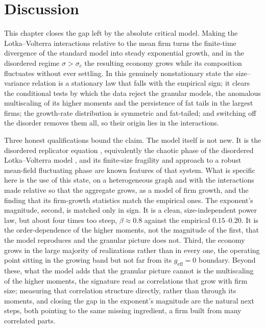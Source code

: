 \section{Discussion}
\label{sec:growing-discussion}

This chapter closes the gap left by the absolute critical model. Making the
Lotka--Volterra interactions relative to the mean firm turns the finite-time divergence
of the standard model into steady exponential growth, and in the disordered regime
$\sigma > \sigma_c$ the resulting economy grows while its composition fluctuates without
ever settling. In this genuinely nonstationary state the size--variance relation is a
stationary law that falls with the empirical sign; it clears the conditional tests by
which the data reject the granular models, the anomalous multiscaling of its higher
moments and the persistence of fat tails in the largest firms; the growth-rate
distribution is symmetric and fat-tailed; and switching off the disorder removes them all, so
their origin lies in the interactions.

Three honest qualifications bound the claim. The model itself is not new. It is the
disordered replicator equation \citep{diederich1989,hofbauer81}, equivalently the
chaotic phase of the disordered Lotka--Volterra model \citep{bunin2017,galla2018,roy2020},
and its finite-size fragility and approach to a robust mean-field fluctuating phase are
known features of that system. What is specific here is the use of this state, on a
heterogeneous graph and with the interactions made relative so that the aggregate grows,
as a model of firm growth, and the finding that its firm-growth statistics match the
empirical ones. The exponent's magnitude, second, is matched only in sign. It is a clean,
size-independent power law, but about four times too steep, $\beta \approx 0.8$ against the
empirical $0.15$--$0.20$. It is the order-dependence of the higher moments, not
the magnitude of the first, that the model reproduces and the granular picture does not.
Third, the economy grows in the large
majority of realizations rather than in every one, the operating point sitting in the
growing band but not far from its $g_{\mathrm{eff}} = 0$ boundary. Beyond these, what the model adds that the granular picture cannot is the multiscaling of
the higher moments, the signature \citet{moran2024} read as correlations that grow with
firm size; measuring that correlation structure directly,
rather than through its moments, and closing the gap in the exponent's
magnitude are the natural
next steps, both pointing to the same missing ingredient, a firm built from many
correlated parts.
